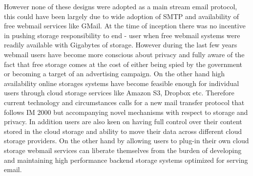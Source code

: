 However none of these designs were adopted as a main stream email protocol, this
could have been largely due to wide adoption of SMTP and availability of free
webmail services like GMail\cite{GMail}. At the time of inception there was no 
incentive in pushing storage responsibility to end - user when free webmail 
systems  were readily available with Gigabytes of storage. However during the 
last few years webmail users have become more conscious about privacy and fully 
aware of the fact that free storage comes at the cost of either being spied by 
the  government or becoming a target of an advertising campaign. On the other 
hand high availability online storages systems have become feasible enough for 
individual users through cloud storage services like Amazon S3\cite{AWS-S3},
Dropbox\cite{DROPBOX} etc. Therefore current technology and circumstances calls 
for a new mail transfer protocol that follows IM 2000 but accompanying novel 
mechanisms with respect to storage and privacy. In addition users are also keen 
on having full control over their content stored in the cloud storage and ability 
to move their data across different cloud storage providers. On the other hand by 
allowing users to plug-in their own cloud storage webmail services can liberate 
themselves from the burden of developing and maintaining high performance backend 
storage systems optimized for serving email.


